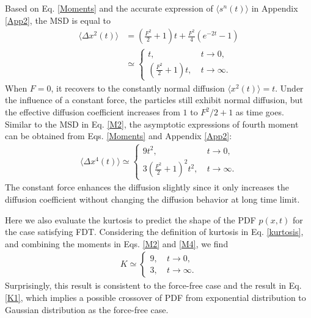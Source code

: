 \documentclass[aps,pre,twocolumn,groupedaddress,longbibliography]{revtex4-2}
\begin{document}
Based on Eq. \eqref{Moments} and the accurate expression of $\langle s^n(t)\rangle$ in Appendix \ref{App2}, the MSD is equal to
\begin{equation}\label{M2}
\begin{split}
\langle\Delta x^2(t)\rangle&=\left(\frac{F^2}{2}+1\right)t+\frac{F^2}{4}(e^{-2t}-1)\\
&\simeq \left\{
\begin{array}{ll}
  t, &~t\rightarrow 0,  \\[5pt]
  \left(\frac{F^2}{2}+1\right)t,  & ~t\rightarrow \infty.
\end{array}\right.
\end{split}
\end{equation}
When $F=0$, it recovers to the constantly normal diffusion $\langle x^2(t)\rangle=t$.
Under the influence of a constant force, the particles still exhibit normal diffusion, but the effective diffusion coefficient increases from $1$ to $F^2/2+1$ as time goes.
Similar to the MSD in Eq. \eqref{M2}, the asymptotic expressions of fourth moment can be obtained from Eqs. \eqref{Moments} and Appendix \ref{App2}:
\begin{equation}\label{M4}
\begin{split}
\langle \Delta x^4(t)\rangle\simeq \left\{
\begin{array}{ll}
  9t^2, &~t\rightarrow 0,  \\[5pt]
  3\left(\frac{F^2}{2}+1\right)^2t^2,  & ~t\rightarrow \infty.
\end{array}\right.
\end{split}
\end{equation}
The constant force enhances the diffusion slightly since it only increases the diffusion coefficient without changing the diffusion behavior at long time limit.

Here we also evaluate the kurtosis to predict the shape of the PDF $p(x,t)$ for the case satisfying FDT. Considering the definition of kurtosis in Eq. \eqref{kurtosis}, and combining the moments in Eqs. \eqref{M2} and \eqref{M4}, we find
\begin{equation}\label{K2}
\begin{split}
K\simeq \left\{
\begin{array}{ll}
  9, &~ t\rightarrow 0, \\[5pt]
  3,  & ~t\rightarrow\infty.
\end{array}\right.
\end{split}
\end{equation}
Surprisingly, this result is consistent to the force-free case and the result in Eq. \eqref{K1}, which implies a possible crossover of PDF from exponential distribution to Gaussian distribution as the force-free case.
\end{document}
